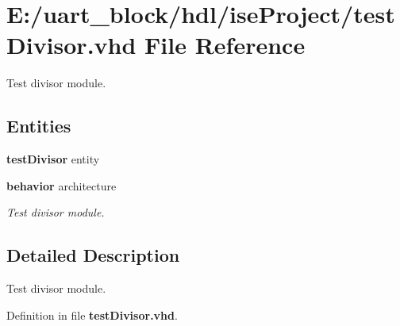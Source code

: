 \section{E\-:/uart\-\_\-block/hdl/ise\-Project/test\-Divisor.vhd File Reference}
\label{test_divisor_8vhd}


Test divisor module.  


\subsection*{Entities}
\begin{DoxyCompactItemize}
\item 
{\bf test\-Divisor} entity
\item 
{\bf behavior} architecture
\begin{DoxyCompactList}\small\item\em Test divisor module. \end{DoxyCompactList}\end{DoxyCompactItemize}


\subsection{Detailed Description}
Test divisor module. 

Definition in file {\bf test\-Divisor.\-vhd}.

